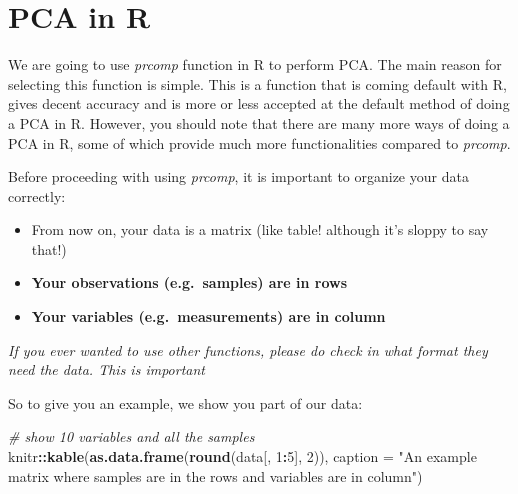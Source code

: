 \documentclass[
]{book}
\newenvironment{Shaded}{\begin{snugshade}}{\end{snugshade}}
\newcommand{\CommentTok}[1]{\textcolor[rgb]{0.56,0.35,0.01}{\textit{#1}}}
\newcommand{\DataTypeTok}[1]{\textcolor[rgb]{0.13,0.29,0.53}{#1}}
\newcommand{\DecValTok}[1]{\textcolor[rgb]{0.00,0.00,0.81}{#1}}
\newcommand{\KeywordTok}[1]{\textcolor[rgb]{0.13,0.29,0.53}{\textbf{#1}}}
\newcommand{\NormalTok}[1]{#1}
\newcommand{\OperatorTok}[1]{\textcolor[rgb]{0.81,0.36,0.00}{\textbf{#1}}}
\newcommand{\StringTok}[1]{\textcolor[rgb]{0.31,0.60,0.02}{#1}}
\providecommand{\tightlist}{%
  \setlength{\itemsep}{0pt}\setlength{\parskip}{0pt}}
\theoremstyle{definition}
\theoremstyle{definition}
\theoremstyle{definition}
\theoremstyle{remark}
\begin{document}
\hypertarget{pcar}{%
\section{PCA in R}\label{pcar}}

We are going to use \emph{prcomp} function in R to perform PCA. The main reason for selecting this function is simple. This is a function that is coming default with R, gives decent accuracy and is more or less accepted at the default method of doing a PCA in R. However, you should note that there are many more ways of doing a PCA in R, some of which provide much more functionalities compared to \emph{prcomp}.

Before proceeding with using \emph{prcomp}, it is important to organize your data correctly:

\begin{itemize}
\tightlist
\item
  From now on, your data is a matrix (like table! although it's sloppy to say that!)
\item
  \textbf{Your observations (e.g.~samples) are in rows}
\item
  \textbf{Your variables (e.g.~measurements) are in column}
\end{itemize}

\emph{If you ever wanted to use other functions, please do check in what format they need the data. This is important}

So to give you an example, we show you part of our data:

\begin{Shaded}
\begin{Highlighting}[]
\CommentTok{# show 10 variables and all the samples}
\NormalTok{knitr}\OperatorTok{::}\KeywordTok{kable}\NormalTok{(}\KeywordTok{as.data.frame}\NormalTok{(}\KeywordTok{round}\NormalTok{(data[, }\DecValTok{1}\OperatorTok{:}\DecValTok{5}\NormalTok{], }\DecValTok{2}\NormalTok{)), }
    \DataTypeTok{caption =} \StringTok{"An example matrix where samples are in the rows and variables are in column"}\NormalTok{)}
\end{Highlighting}
\end{Shaded}
\end{document}

